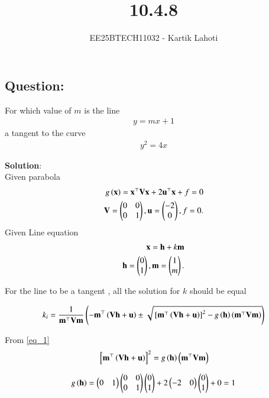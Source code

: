 \documentclass[journal]{IEEEtran}
\numberwithin{equation}{enumi}
\numberwithin{figure}{enumi}
\begin{document}

\vspace{3cm}

\title{10.4.8}
\author{EE25BTECH11032 - Kartik Lahoti}
\maketitle

\subsection*{Question: } 
For which value of $m$ is the line
\begin{align}
    y = mx + 1
\end{align}
a tangent to the curve 
\begin{align}
    y^2 = 4x
\end{align}

\textbf{Solution}:\\

Given parabola 
\begin{align}
    g\left(\mathbf{x}\right) = \mathbf{x}^{\top}\mathbf{V}\mathbf{x} + 2\mathbf{u}^{\top}\mathbf{x} + f = 0 \\
    \mathbf{V} = \begin{pmatrix}0&0\\0&1\end{pmatrix} , \mathbf{u} = \begin{pmatrix}-2\\0\end{pmatrix} , f = 0.
\end{align}
Given Line equation
\begin{align}
    \mathbf{x} = \mathbf{h} + k\mathbf{m}\\
    \mathbf{h} = \begin{pmatrix}0\\1\end{pmatrix} , \mathbf{m} = \begin{pmatrix}1 \\ m\end{pmatrix}.
\end{align}

For the line to be a tangent , all the solution for $k$ should be equal

\begin{align}
    k_i = \frac{1}{\mathbf{m}^{\top}\mathbf{V}\mathbf{m}}\left(-\mathbf{m}^{\top}\left(\mathbf{V}\mathbf{h}+\mathbf{u}\right) \pm \sqrt{{}\left[\mathbf{m}^{\top}\left(\mathbf{V}\mathbf{h}+\mathbf{u}\right)\right]^2-g\left(\mathbf{h}\right)\left(\mathbf{m}^{\top}\mathbf{V}\mathbf{m}\right)}\right) \label{eq_1}
\end{align}

From \ref{eq_1} 
\begin{align}
    {}\left[\mathbf{m}^{\top}\left(\mathbf{V}\mathbf{h}+\mathbf{u}\right)\right]^2 = g\left(\mathbf{h}\right)\left(\mathbf{m}^{\top}\mathbf{V}\mathbf{m}\right) \label{eq_3}
\end{align}

\begin{align}
    g\left(\mathbf{h}\right) = \begin{pmatrix}0&1\end{pmatrix}\begin{pmatrix}0&0\\0&1\end{pmatrix}\begin{pmatrix}0\\1\end{pmatrix} + 2\begin{pmatrix}-2&0\end{pmatrix}\begin{pmatrix}0\\1\end{pmatrix} + 0 = 1 \label{eq_2}
\end{align}
\end{document}
